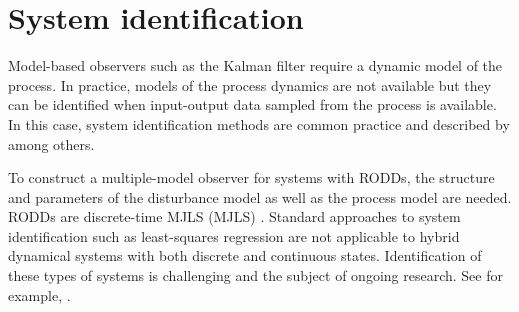 \section{System identification} \label{sec:sys-id}

Model-based observers such as the Kalman filter require a dynamic model of the process. In practice, models of the process dynamics are not available but they can be identified when input-output data sampled from the process is available. In this case, system identification methods are common practice and described by \cite{ljung_system_1999} among others.

To construct a multiple-model observer for systems with \gls{RODD}s, the structure and parameters of the disturbance model as well as the process model are needed. \gls{RODD}s are discrete-time \acrlong{MJLS} (\acrshort{MJLS}) \citep{costa_discrete-time_2005}. Standard approaches to system identification such as least-squares regression are not applicable to hybrid dynamical systems with both discrete and continuous states. Identification of these types of systems is challenging and the subject of ongoing research. See for example, \cite{piga_estimation_2020}.


